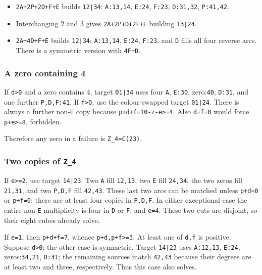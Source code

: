 \documentclass[
  10pt,
]{article}
\providecommand{\tightlist}{%
  \setlength{\itemsep}{0pt}\setlength{\parskip}{0pt}}
\begin{document}
\begin{itemize}
\tightlist
\item
  \texttt{2A+2P+2D+F+E} builds \texttt{12∣34}: \texttt{A:13,14},
  \texttt{E:24}, \texttt{F:23}, \texttt{D:31,32}, \texttt{P:41,42}.
\item
  Interchanging 2 and 3 gives \texttt{2A+2P+D+2F+E} building
  \texttt{13∣24}.
\item
  \texttt{2A+4D+F+E} builds \texttt{12∣34}: \texttt{A:13,14},
  \texttt{E:24}, \texttt{F:23}, and \texttt{D} fills all four reverse
  arcs. There is a symmetric version with \texttt{4F+D}.
\end{itemize}

\hypertarget{a-zero-containing-4}{%
\subsubsection*{A zero containing 4}\label{a-zero-containing-4}}

If \texttt{d\textgreater{}0} and a zero contains 4, target
\texttt{01∣34} uses four \texttt{A}, \texttt{E:30}, zero:\texttt{40},
\texttt{D:31}, and one further \texttt{P,D,F:41}. If
\texttt{f\textgreater{}0}, use the colour-swapped target \texttt{01∣24}.
There is always a further non-\texttt{E} copy because
\texttt{p+d+f=10-z-e\textgreater{}=4}. Also \texttt{d=f=0} would force
\texttt{p+e\textgreater{}=8}, forbidden.

Therefore any zero in a failure is \texttt{Z\_4=C(23)}.

\hypertarget{two-copies-of-z_4}{%
\subsubsection*{\texorpdfstring{Two copies of
\texttt{Z\_4}}{Two copies of Z\_4}}\label{two-copies-of-z_4}}

If \texttt{e\textgreater{}=2}, use target \texttt{14∣23}. Two \texttt{A}
fill \texttt{12,13}, two \texttt{E} fill \texttt{24,34}, the two zeros
fill \texttt{21,31}, and two \texttt{P,D,F} fill \texttt{42,43}. These
last two arcs can be matched unless \texttt{p+d=0} or \texttt{p+f=0};
there are at least four copies in \texttt{P,D,F}. In either exceptional
case the entire non-\texttt{E} multiplicity is four in \texttt{D} or
\texttt{F}, and \texttt{e=4}. These two cuts are disjoint, so their
eight cubes already solve.

If \texttt{e=1}, then \texttt{p+d+f=7}, whence
\texttt{p+d,p+f\textgreater{}=3}. At least one of \texttt{d,f} is
positive. Suppose \texttt{d\textgreater{}0}; the other case is
symmetric. Target \texttt{14∣23} uses \texttt{A:12,13}, \texttt{E:24},
zeros:\texttt{34,21}, \texttt{D:31}; the remaining sources match
\texttt{42,43} because their degrees are at least two and three,
respectively. Thus this case also solves.
\end{document}

